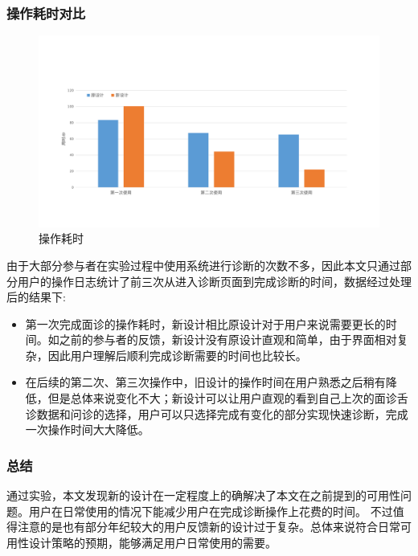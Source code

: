 \subsubsection{操作耗时对比}

\begin{figure}[ht]
    \centering
    \includegraphics[width=13cm]{images/time.pdf}
    \caption{操作耗时}
    \label{fig:ui-time}
\end{figure}

由于大部分参与者在实验过程中使用系统进行诊断的次数不多，因此本文只通过部分用户的操作日志统计了前三次从进入诊断页面到完成诊断的时间，数据经过处理后的结果下:
\begin{itemize}

    \item 第一次完成面诊的操作耗时，新设计相比原设计对于用户来说需要更长的时间。如之前的参与者的反馈，新设计没有原设计直观和简单，由于界面相对复杂，因此用户理解后顺利完成诊断需要的时间也比较长。

    \item 在后续的第二次、第三次操作中，旧设计的操作时间在用户熟悉之后稍有降低，但是总体来说变化不大；新设计可以让用户直观的看到自己上次的面诊舌诊数据和问诊的选择，用户可以只选择完成有变化的部分实现快速诊断，完成一次操作时间大大降低。

\end{itemize}

\subsubsection{总结}
通过实验，本文发现新的设计在一定程度上的确解决了本文在之前提到的可用性问题。用户在日常使用的情况下能减少用户在完成诊断操作上花费的时间。
不过值得注意的是也有部分年纪较大的用户反馈新的设计过于复杂。总体来说符合日常可用性设计策略的预期，能够满足用户日常使用的需要。


